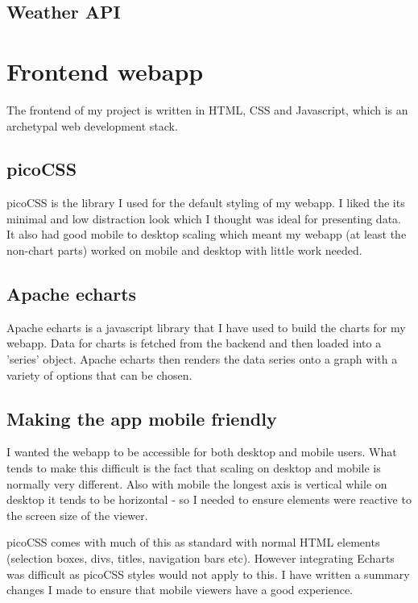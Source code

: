 \subsection{Weather API}

\section{Frontend webapp}

The frontend of my project is written in HTML, CSS and Javascript, which is an
archetypal web development stack.

\subsection{picoCSS}

picoCSS is the library I used for the default styling of my webapp. I liked the
its minimal and low distraction look which I thought was ideal for presenting
data. It also had good mobile to desktop scaling which meant my webapp (at least
the non-chart parts) worked on mobile and desktop with little work needed.

\subsection{Apache echarts}

Apache echarts is a javascript library that I have used to build the charts for
my webapp. Data for charts is fetched from the backend and then loaded into a
'series' object. Apache echarts then renders the data series onto a graph with a
variety of options that can be chosen.


\subsection{Making the app mobile friendly}

I wanted the webapp to be accessible for both desktop and mobile users. What
tends to make this difficult is the fact that scaling on desktop and mobile is
normally very different. Also with mobile the longest axis is vertical while on
desktop it tends to be horizontal - so I needed to ensure elements were reactive
to the screen size of the viewer.

picoCSS comes with much of this as standard with normal HTML elements (selection
boxes, divs, titles, navigation bars etc). However integrating Echarts was
difficult as picoCSS styles would not apply to this. I have written a summary
changes I made to ensure that mobile viewers have a good experience.

